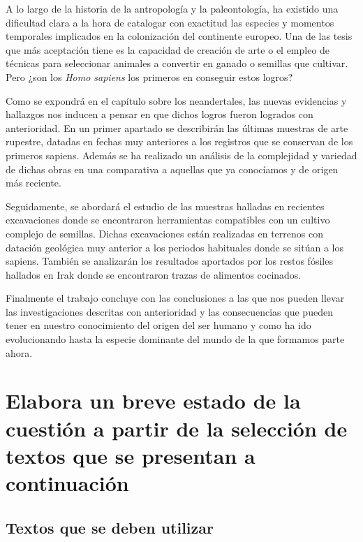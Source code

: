\documentclass[12pt, a4paper, oneside]{report}
\begin{document}
            A lo largo de la historia de la antropología y la paleontología, ha existido una dificultad clara
            a la hora de catalogar con exactitud las especies y momentos temporales implicados en la
            colonización del continente europeo. Una de las tesis que más aceptación tiene es la capacidad de
            creación de arte o el empleo de técnicas para seleccionar animales a convertir en ganado o
            semillas que cultivar. Pero ¿son los \emph{Homo sapiens} los primeros en conseguir estos logros?

            Como se expondrá en el capítulo sobre los neandertales, las nuevas evidencias y hallazgos nos
            inducen a pensar en que dichos logros fueron logrados con anterioridad. En un primer apartado se
            describirán las últimas muestras de arte rupestre, datadas en fechas muy anteriores a los
            registros que se conservan de los primeros sapiens. Además se ha realizado un análisis de la
            complejidad y variedad de dichas obras en una comparativa a aquellas que ya conocíamos y de origen
            más reciente.

            Seguidamente, se abordará el estudio de las muestras halladas en recientes excavaciones donde se
            encontraron herramientas compatibles con un cultivo complejo de semillas. Dichas excavaciones
            están realizadas en terrenos con datación geológica muy anterior a los periodos habituales donde
            se sitúan a los sapiens. También se analizarán los resultados aportados por los restos fósiles
            hallados en Irak donde se encontraron trazas de alimentos cocinados.

            Finalmente el trabajo concluye con las conclusiones a las que nos pueden llevar las
            investigaciones descritas con anterioridad y las consecuencias que pueden tener en nuestro
            conocimiento del origen del ser humano y como ha ido evolucionando hasta la especie dominante del
            mundo de la que formamos parte ahora.
        \clearpage

        \chapter{Elabora un breve estado de la cuestión a partir de la selección de textos que se presentan a continuación}
            \setcounter{section}{0}
            \section{Textos que se deben utilizar}
\end{document}
